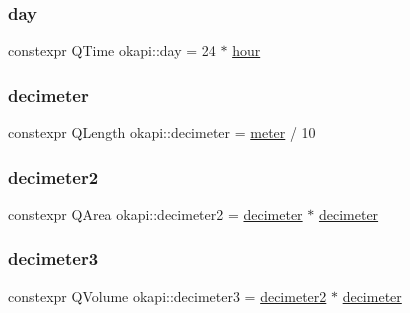 \mbox{\label{namespaceokapi_a5bb9617e1f2db13eaad2fe9d47f49195}} 
\subsubsection{\texorpdfstring{day}{day}}
{\footnotesize\ttfamily constexpr Q\+Time okapi\+::day = 24 $\ast$ \mbox{\hyperlink{namespaceokapi_a43d321d318cb594798b60a6be26e85ce}{hour}}}

\mbox{\label{namespaceokapi_adeefe08fd5193fd9090e198b1a3463b9}} 
\subsubsection{\texorpdfstring{decimeter}{decimeter}}
{\footnotesize\ttfamily constexpr Q\+Length okapi\+::decimeter = \mbox{\hyperlink{namespaceokapi_a59563b3d4b18633f1c8d852e2932d1db}{meter}} / 10}

\mbox{\label{namespaceokapi_a554ff440baa9c27432dcbc8068fbf47e}} 
\subsubsection{\texorpdfstring{decimeter2}{decimeter2}}
{\footnotesize\ttfamily constexpr Q\+Area okapi\+::decimeter2 = \mbox{\hyperlink{namespaceokapi_adeefe08fd5193fd9090e198b1a3463b9}{decimeter}} $\ast$ \mbox{\hyperlink{namespaceokapi_adeefe08fd5193fd9090e198b1a3463b9}{decimeter}}}

\mbox{\label{namespaceokapi_a4f07207ec37be4257d882710d97a3de9}} 
\subsubsection{\texorpdfstring{decimeter3}{decimeter3}}
{\footnotesize\ttfamily constexpr Q\+Volume okapi\+::decimeter3 = \mbox{\hyperlink{namespaceokapi_a554ff440baa9c27432dcbc8068fbf47e}{decimeter2}} $\ast$ \mbox{\hyperlink{namespaceokapi_adeefe08fd5193fd9090e198b1a3463b9}{decimeter}}}


